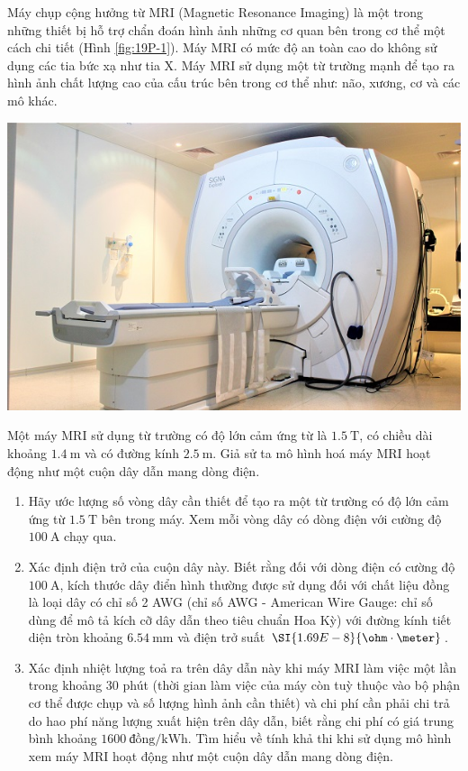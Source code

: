 \begin{ex}
Máy chụp cộng hưởng từ MRI (Magnetic Resonance Imaging) là một trong những thiết bị hỗ trợ chẩn đoán hình ảnh những cơ quan bên trong cơ thể một cách chi tiết (Hình \ref{fig:19P-1}). Máy MRI có mức độ an toàn cao do không sử dụng các tia bức xạ như tia X. Máy MRI sử dụng một từ trường mạnh để tạo ra hình ảnh chất lượng cao của cấu trúc bên trong cơ thể như: não, xương, cơ và các mô khác.
\begin{center}
	\includegraphics[width=0.4\linewidth]{../figs/VN12-Y24-PH-SYL-019P-1}
	\label{fig:19P-1}
\end{center} 
Một máy MRI sử dụng từ trường có độ lớn cảm ứng từ là $\SI{1.5}{\tesla}$, có chiều dài khoảng $\SI{1.4}{\meter}$ và có đường kính $\SI{2.5}{\meter}$. Giả sử ta mô hình hoá máy MRI hoạt động như một cuộn dây dẫn mang dòng điện.
\begin{enumerate}[label=\alph*)]
	\item Hãy ước lượng số vòng dây cần thiết để tạo ra một từ trường có độ lớn cảm ứng từ $\SI{1.5}{\tesla}$ bên trong máy. Xem mỗi vòng dây có dòng điện với cường độ $\SI{100}{\ampere}$ chạy qua.
	\item Xác định điện trở của cuộn dây này. Biết rằng đối với dòng điện có cường độ $\SI{100}{\ampere}$, kích thước dây điển hình thường được sử dụng đối với chất liệu đồng là loại dây có chỉ số 2 AWG (chỉ số AWG - American Wire Gauge: chỉ số dùng để mô tả kích cỡ dây dẫn theo tiêu chuẩn Hoa Kỳ) với đường kính tiết diện tròn khoảng $\SI{6.54}{\milli\meter}$ và điện trở suất $\SI{1.69E-8}{\ohm\cdot\meter}$.
	\item Xác định nhiệt lượng toả ra trên dây dẫn này khi máy MRI làm việc một lần trong khoảng 30 phút (thời gian làm việc của máy còn tuỳ thuộc vào bộ phận cơ thể được chụp và số lượng hình ảnh cần thiết) và chi phí cần phải chi trả do hao phí năng lượng xuất hiện trên dây dẫn, biết rằng chi phí có giá trung bình khoảng $\SI{1600}{\text{đồng}/\kilo\watt\hour}$. Tìm hiểu về tính khả thi khi sử dụng mô hình xem máy MRI hoạt động như một cuộn dây dẫn mang dòng điện.
\end{enumerate}

\end{ex}
